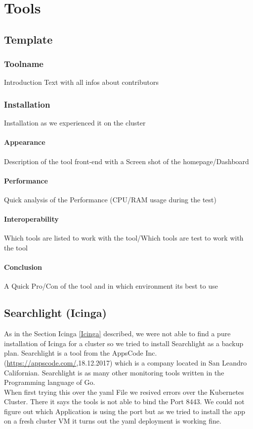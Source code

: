  
\chapter{Tools} %
\section{Template}
\subsection{Toolname}
\label{Toolname} %
Introduction Text with all infos about contributors 
\subsection{Installation}
Installation as we experienced it on the cluster
\subsubsection{Appearance}%
Description of the tool front-end with a Screen shot of the homepage/Dashboard
\subsubsection{Performance}
Quick analysis of the Performance (CPU/RAM usage during the test)
\subsubsection{Interoperability}
Which tools are listed to work with the tool/Which tools are test to work with the tool
\subsubsection{Conclusion}
A Quick Pro/Con of the tool and in which environment its best to use
\section{Searchlight (Icinga)}
\label{searchlight}
As in the Section Icinga \ref{Icinga} described, we were not able to find a pure installation of Icinga for a cluster so we tried to install Searchlight as a backup plan.
Searchlight is a tool from the AppsCode Inc. (\url{https://appscode.com/},18.12.2017) which is a company located in San Leandro Californian. 
Searchlight is as many other monitoring tools written in the Programming language of Go.
\\
When first trying this over the yaml File we resived errors over the Kubernetes Cluster. There it says the tools is not able to bind the Port 8443. We could not figure out which Application is using the port but as we tried to install the app on a fresh cluster VM it turns out the yaml deployment is working fine.
